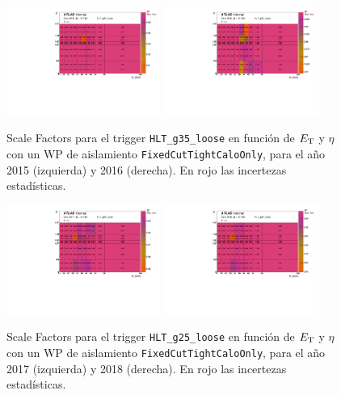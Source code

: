 
\begin{figure}[!htpb]
  \centering
      {\includegraphics[width=0.45\textwidth]{images/trigger/2015_h_sf_et_eta_tr_HLT_g35_loose_FixedCutTightCaloOnly.pdf}}
      {\includegraphics[width=0.45\textwidth]{images/trigger/2016_h_sf_et_eta_tr_HLT_g35_loose_FixedCutTightCaloOnly.pdf}}
      \caption{Scale Factors para el trigger \texttt{HLT\_g35\_loose} en función de $E_{\text{T}}$ y $\eta$ con un WP de aislamiento \texttt{FixedCutTightCaloOnly}, para el año 2015 (izquierda) y 2016 (derecha). En rojo las incertezas estadísticas.}
      \label{fig:SFs_2015_2016}
\end{figure}
\begin{figure}[!htpb]
  \centering
      {\includegraphics[width=0.45\textwidth]{images/trigger/2017_h_sf_et_eta_tr_HLT_g25_loose_FixedCutTightCaloOnly.pdf}}
      {\includegraphics[width=0.45\textwidth]{images/trigger/2018_h_sf_et_eta_tr_HLT_g25_loose_FixedCutTightCaloOnly.pdf}}
      \caption{Scale Factors para el trigger \texttt{HLT\_g25\_loose} en función de $E_{\text{T}}$ y $\eta$ con un WP de aislamiento \texttt{FixedCutTightCaloOnly}, para el año 2017 (izquierda) y 2018 (derecha). En rojo las incertezas estadísticas.}
      \label{fig:SFs_2017_2018}
\end{figure}


